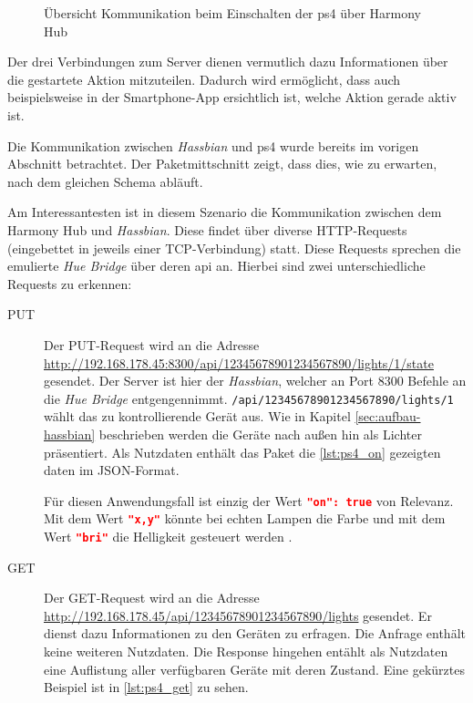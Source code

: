 \begin{figure}[ht!]
    \centering
    \resizebox{\textwidth}{!}{
        
    }
    \caption{Übersicht Kommunikation beim Einschalten der \ac{ps4} über Harmony Hub}
    \label{fig:ps-ein-harmony}
\end{figure}

Der drei Verbindungen zum Server dienen vermutlich dazu Informationen über die gestartete Aktion mitzuteilen.
Dadurch wird ermöglicht, dass auch beispielsweise in der Smartphone-App ersichtlich ist, welche Aktion gerade aktiv ist.

Die Kommunikation zwischen \textit{Hassbian} und \ac{ps4} wurde bereits im vorigen Abschnitt betrachtet.
Der Paketmittschnitt zeigt, dass dies, wie zu erwarten, nach dem gleichen Schema abläuft.

Am Interessantesten ist in diesem Szenario die Kommunikation zwischen dem Harmony Hub und \textit{Hassbian}.
Diese findet über diverse HTTP-Requests (eingebettet in jeweils einer TCP-Verbindung) statt.
Diese Requests sprechen die emulierte \textit{Hue Bridge} über deren \ac{api} an.
Hierbei sind zwei unterschiedliche Requests zu erkennen:
\begin{description}
    \item[PUT]
        Der PUT-Request wird an die Adresse \url{http://192.168.178.45:8300/api/12345678901234567890/lights/1/state} gesendet.
        Der Server ist hier der \textit{Hassbian}, welcher an Port 8300 Befehle an die \textit{Hue Bridge} entgengennimmt.
        \texttt{/api/12345678901234567890/lights/1} wählt das zu kontrollierende Gerät aus.
        Wie in Kapitel \ref{sec:aufbau-hassbian} \textit{} beschrieben werden die Geräte nach außen hin als Lichter präsentiert.
        Als Nutzdaten enthält das Paket die \autoref{lst:ps4_on} gezeigten daten im JSON-Format.
        
        Für diesen Anwendungsfall ist einzig der Wert \lstinline[language=json]{"on": true} von Relevanz.
        Mit dem Wert \lstinline[language=json]{"x,y"} könnte bei echten Lampen die Farbe
        und mit dem Wert \lstinline[language=json]{"bri"} die Helligkeit gesteuert werden \cite{Coreconc26:online}.
    \item[GET]
        Der GET-Request wird an die Adresse \url{http://192.168.178.45/api/12345678901234567890/lights} gesendet.
        Er dienst dazu Informationen zu den Geräten zu erfragen.
        Die Anfrage enthält keine weiteren Nutzdaten.
        Die Response hingehen entählt als Nutzdaten eine Auflistung aller verfügbaren Geräte mit deren Zustand.
        Eine gekürztes Beispiel ist in \autoref{lst:ps4_get} zu sehen.
        
\end{description}

